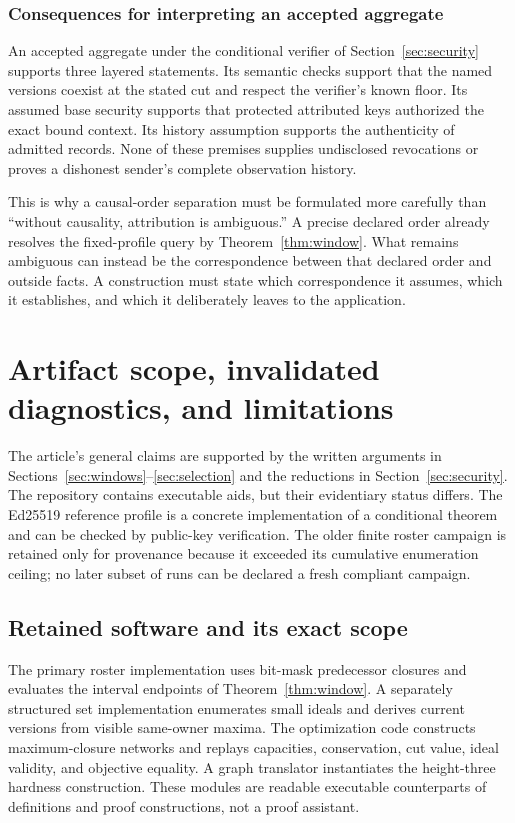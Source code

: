 \documentclass[11pt]{article}
\theoremstyle{definition}
\begin{document}
\subsubsection{Consequences for interpreting an accepted aggregate}
An accepted aggregate under the conditional verifier of Section~\ref{sec:security} supports three layered statements. Its semantic checks support that the named versions coexist at the stated cut and respect the verifier's known floor. Its assumed base security supports that protected attributed keys authorized the exact bound context. Its history assumption supports the authenticity of admitted records. None of these premises supplies undisclosed revocations or proves a dishonest sender's complete observation history.

This is why a causal-order separation must be formulated more carefully than ``without causality, attribution is ambiguous.'' A precise declared order already resolves the fixed-profile query by Theorem~\ref{thm:window}. What remains ambiguous can instead be the correspondence between that declared order and outside facts. A construction must state which correspondence it assumes, which it establishes, and which it deliberately leaves to the application.

\section{Artifact scope, invalidated diagnostics, and limitations}\label{sec:evidence}
The article's general claims are supported by the written arguments in Sections~\ref{sec:windows}--\ref{sec:selection} and the reductions in Section~\ref{sec:security}.  The repository contains executable aids, but their evidentiary status differs.  The Ed25519 reference profile is a concrete implementation of a conditional theorem and can be checked by public-key verification.  The older finite roster campaign is retained only for provenance because it exceeded its cumulative enumeration ceiling; no later subset of runs can be declared a fresh compliant campaign.

\subsection{Retained software and its exact scope}
The primary roster implementation uses bit-mask predecessor closures and evaluates the interval endpoints of Theorem~\ref{thm:window}.  A separately structured set implementation enumerates small ideals and derives current versions from visible same-owner maxima.  The optimization code constructs maximum-closure networks and replays capacities, conservation, cut value, ideal validity, and objective equality.  A graph translator instantiates the height-three hardness construction.  These modules are readable executable counterparts of definitions and proof constructions, not a proof assistant.
\end{document}
